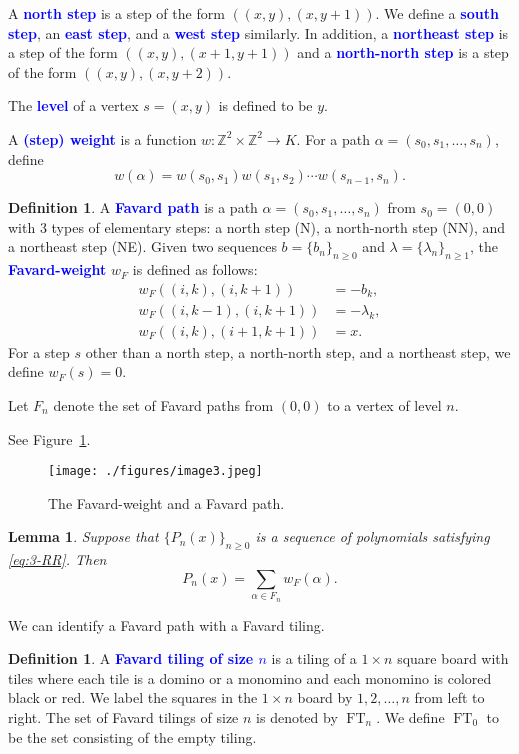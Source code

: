 \documentclass{amsart}
\numberwithin{equation}{section}
\newtheorem{lem}[thm]{Lemma}
\theoremstyle{definition}
\newtheorem{defn}[thm]{Definition}
\newcommand{\ZZ}{\mathbb{Z}}
\newcommand\FT{\operatorname{FT}}
\renewcommand\emph[1]{\textcolor{blue}{\bf #1}}
\begin{document}
A \emph{north step} is a step of the form \( ((x,y), (x,y+1)) \). We
define a \emph{south step}, an \emph{east step}, and a \emph{west
  step} similarly. In addition, a \emph{northeast step} is a step of
the form \( ((x,y), (x+1,y+1)) \) and a \emph{north-north step} is a
step of the form \( ((x,y), (x,y+2)) \).

The \emph{level} of a vertex \( s=(x,y) \) is defined to be \( y \).


A \emph{(step) weight} is a function \( w:\ZZ^2\times\ZZ^2\to K \).
For a path \( \alpha=(s_0,s_1,\dots,s_n) \), define
\[
  w(\alpha) = w(s_0,s_1) w(s_1,s_2) \cdots w(s_{n-1},s_n).
\]


\begin{defn}
  A \emph{Favard path} is a path \( \alpha=(s_0,s_1,\dots,s_n) \) from
  \( s_0=(0,0) \) with 3 types of elementary steps: a north step (N),
  a north-north step (NN), and a northeast step (NE). Given two
  sequences \( b= \{ b_n\}_{n\ge 0} \) and
  \( \lambda=\{ \lambda_n\}_{n\ge 1} \),
  the \emph{Favard-weight} \( w_F \) is defined as follows:
  \begin{align*}
    w_F((i,k),(i,k+1)) &= -b_k,\\
    w_F((i,k-1),(i,k+1)) &= -\lambda_k,\\
    w_F((i,k),(i+1,k+1)) &= x.
  \end{align*}
  For a step \( s \) other than a north step, a north-north step, and
  a northeast step, we define \( w_F(s) = 0 \).
\end{defn}

Let \( F_n \) denote the set of Favard paths from \( (0,0) \) to a
vertex of level \( n \).

 See Figure~\ref{fig:image3}.

\begin{figure}
  \centering
  \texttt{[image: ./figures/image3.jpeg]}
  \caption{The Favard-weight and a Favard path.}
  \label{fig:image3}
\end{figure}

\begin{lem}
  Suppose that \( \{ P_n(x) \}_{n\ge 0} \)
  is a sequence of polynomials satisfying \eqref{eq:3-RR}.
  Then
  \[
    P_n(x) = \sum_{\alpha\in F_n} w_F(\alpha).
  \]
\end{lem}

We can identify a Favard path with a Favard tiling.

\begin{defn}
  A \emph{Favard tiling of size $n$} is a tiling of a $1\times n$
  square board with tiles where each tile is a domino or a monomino
  and each monomino is colored black or red. We label the squares in
  the $1\times n$ board by $1,2,\dots,n$ from left to right. The set
  of Favard tilings of size $n$ is denoted by $\FT_n$. We define
  \( \FT_0 \) to be the set consisting of the empty tiling.
\end{defn}
\end{document}
